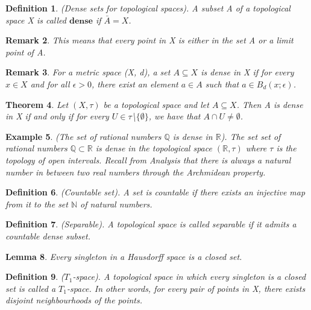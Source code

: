 \documentclass[twoside]{article}
\newcounter{lecnum}
\newtheorem{theorem}{Theorem}[lecnum]
\newtheorem{lemma}[theorem]{Lemma}
\newtheorem{definition}[theorem]{Definition}
\newtheorem{remark}[theorem]{Remark}
\newtheorem{example}[theorem]{Example}
\begin{document}
\begin{definition}(Dense sets for topological spaces). A subset A of a topological space X is called $\textbf{dense}$ if $\bar{A} = X$.
\end{definition}

\begin{remark}This means that every point in X is either in the set A or a limit point of A.
\end{remark}

\begin{remark}For a metric space (X, d), a set $A \subseteq X$ is dense in X if for every $x \in X$ and for all $\epsilon > 0$, there exist an element $a \in A$ such that $a \in B_d(x;\epsilon)$.
\end{remark}

\begin{theorem}Let $(X, \tau)$ be a topological space and let $A \subseteq X$. Then A is dense in X if and only if for every $U \in \tau$\textbackslash$\{\emptyset\}$, we have that $A \cap U \neq \emptyset$.
\end{theorem}

\begin{example}(The set of rational numbers $\mathbb{Q}$ is dense in $\mathbb{R}$). The set set of rational numbers $\mathbb{Q} \subset \mathbb{R}$ is dense in the topological space $(\mathbb{R}, \tau)$ where $\tau$ is the topology of open intervals. Recall from Analysis that there is always a natural number in between two real numbers through the Archmidean property.
\end{example}

\begin{definition}(Countable set). A set is countable if there exists an injective map from it to the set $\mathbb{N}$ of natural numbers.
\end{definition}

\begin{definition}(Separable). A topological space is called separable if it admits a countable dense subset.
\end{definition}

\begin{lemma}Every singleton in a Hausdorff space is a closed set.
\end{lemma}

\begin{definition}($T_1$-space). A topological space in which every singleton is a closed set is called a $T_1$-space. In other words, for every pair of points in X, there exists disjoint neighbourhoods of the points.
\end{definition}
\end{document}
